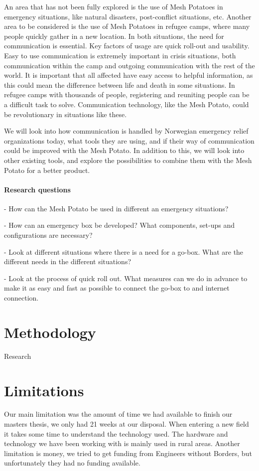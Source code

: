 An area that has not been fully explored is the use of Mesh Potatoes in emergency situations, like natural disasters, post-conflict situations, etc. Another area to be considered is the use of Mesh Potatoes in refugee camps, where many people quickly gather in a new location. In both situations, the need for communication is essential. Key factors of usage are quick roll-out and usability. Easy to use communication is extremely important in crisis situations, both communication within the camp and outgoing communication with the rest of the world. It is important that all affected have easy access to helpful information, as this could mean the difference between life and death in some situations. In refugee camps with thousands of people, registering and reuniting people can be a difficult task to solve. Communication technology, like the Mesh Potato, could be revolutionary in situations like these. 

We will look into how communication is handled by Norwegian emergency relief organizations today, what tools they are using, and if their way of communication could be improved with the Mesh Potato. In addition to this, we will look into other existing tools, and explore the possibilities to combine them with the Mesh Potato for a better product. 

\paragraph{Research questions}
- How can the Mesh Potato be used in different an emergency situations?

- How can an emergency box be developed? What components, set-ups and configurations are necessary?
 
- Look at different situations where there is a need for a go-box. What are the different needs in the different situations?

- Look at the process of quick roll out. What measures can we do in advance to make it as easy and fast as possible to connect the go-box to and internet connection.



\section{Methodology}
Research



\section{Limitations}
Our main limitation was the amount of time we had available to finish our masters thesis, we only had 21 weeks at our disposal. When entering a new field it takes some time to understand the technology used. 
The hardware and technology we have been working with is mainly used in rural areas. Another limitation is money, we tried to get funding from Engineers without Borders, but unfortunately they had no funding available.  


